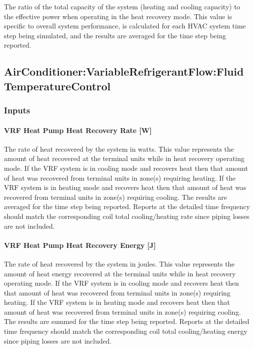 The ratio of the total capacity of the system (heating and cooling capacity) to the effective power when operating in the heat recovery mode. This value is specific to overall system performance, is calculated for each HVAC system time step being simulated, and the results are averaged for the time step being reported.

\subsection{AirConditioner:VariableRefrigerantFlow:FluidTemperatureControl}\label{airconditionervariablerefrigerantflowfluidtemperaturecontrol}
\subsubsection{Inputs}\label{inputs-1-048}

\paragraph{\texorpdfstring{VRF Heat Pump Heat Recovery Rate {[}W{]}}{VRF Heat Pump Heat Recovery Rate}}\label{vrf-heat-pump-heat-recovery-rate}

The rate of heat recovered by the system in watts. This value represents the amount of heat recovered at the terminal units while in heat recovery operating mode. If the VRF system is in cooling mode and recovers heat then that amount of heat was recovered from terminal units in zone(s) requiring heating. If the VRF system is in heating mode and recovers heat then that amount of heat was recovered from terminal units in zone(s) requiring cooling. The results are averaged for the time step being reported. Reports at the detailed time frequency should match the corresponding coil total cooling/heating rate since piping losses are not included.

\paragraph{\texorpdfstring{VRF Heat Pump Heat Recovery Energy {[}J{]}}{VRF Heat Pump Heat Recovery Energy}}\label{vrf-heat-pump-heat-recovery-energy}

The rate of heat recovered by the system in joules. This value represents the amount of heat energy recovered at the terminal units while in heat recovery operating mode. If the VRF system is in cooling mode and recovers heat then that amount of heat was recovered from terminal units in zone(s) requiring heating. If the VRF system is in heating mode and recovers heat then that amount of heat was recovered from terminal units in zone(s) requiring cooling. The results are summed for the time step being reported. Reports at the detailed time frequency should match the corresponding coil total cooling/heating energy since piping losses are not included.

